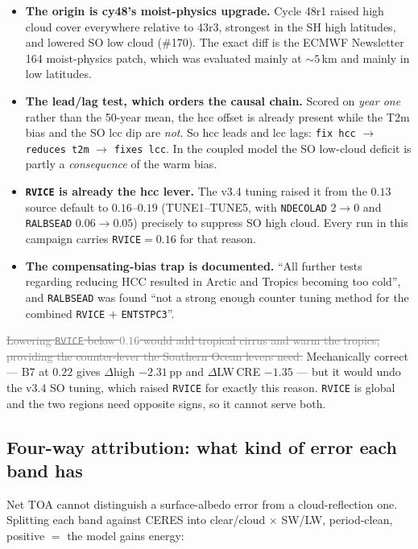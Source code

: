 \documentclass[10pt]{article}
\newcommand{\dead}[1]{\textcolor{gray}{\sout{#1}}}
\begin{document}
\begin{itemize}\itemsep2pt
\item \textbf{The origin is cy48's moist-physics upgrade.} Cycle 48r1 raised high cloud cover
everywhere relative to 43r3, strongest in the SH high latitudes, and lowered SO low cloud
(\#170). The exact diff is the ECMWF Newsletter 164 moist-physics patch, which was evaluated
mainly at ${\sim}5$\,km and mainly in low latitudes.
\item \textbf{The lead/lag test, which orders the causal chain.} Scored on \emph{year one}
rather than the 50-year mean, the hcc offset is already present while the T2m bias and the SO
lcc dip are \emph{not}. So hcc leads and lcc lags: \texttt{fix hcc} $\to$ \texttt{reduces t2m}
$\to$ \texttt{fixes lcc}. In the coupled model the SO low-cloud deficit is partly a
\emph{consequence} of the warm bias.
\item \textbf{\texttt{RVICE} is already the hcc lever.} The v3.4 tuning raised it from the
$0.13$ source default to $0.16$--$0.19$ (TUNE1--TUNE5, with \texttt{NDECOLAD} $2\to0$ and
\texttt{RALBSEAD} $0.06\to0.05$) precisely to suppress SO high cloud. Every run in this
campaign carries \texttt{RVICE}$=0.16$ for that reason.
\item \textbf{The compensating-bias trap is documented.} ``All further tests regarding
reducing HCC resulted in Arctic and Tropics becoming too cold'', and \texttt{RALBSEAD} was
found ``not a strong enough counter tuning method for the combined \texttt{RVICE} $+$
\texttt{ENTSTPC3}''.
\end{itemize}

\dead{Lowering \texttt{RVICE} below $0.16$ would add tropical cirrus and warm the tropics,
providing the counter-lever the Southern Ocean levers need.} Mechanically correct --- B7 at
$0.22$ gives $\Delta$high $-2.31$\,pp and $\Delta$LW\,CRE $-1.35$ --- but it would undo the
v3.4 SO tuning, which raised \texttt{RVICE} for exactly this reason. \texttt{RVICE} is global
and the two regions need opposite signs, so it cannot serve both.

\subsection{Four-way attribution: what kind of error each band has}\label{sub:r23attr}
Net TOA cannot distinguish a surface-albedo error from a cloud-reflection one. Splitting each
band against CERES into clear/cloud $\times$ SW/LW, period-clean, positive $=$ the model gains
energy:
\end{document}
